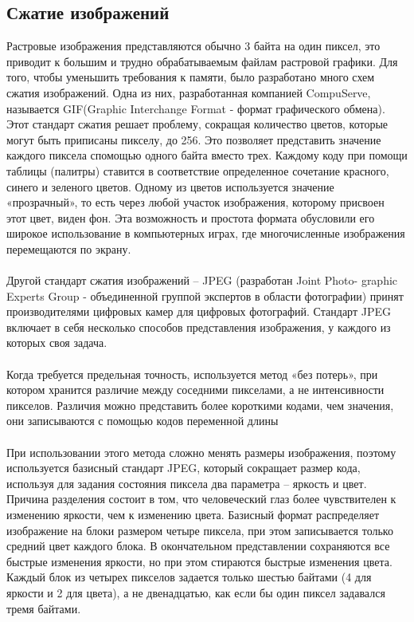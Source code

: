 \subsection{Сжатие изображений}
Растровые изображения представляются обычно 3 байта на один пиксел, это приводит к большим и трудно обрабатываемым файлам растровой графики. Для того, чтобы уменьшить требования к памяти, было разработано много схем сжатия изображений. Одна из них, разработанная компанией CompuServe, называется GIF(Graphic Interchange Format - формат графического обмена). Этот стандарт сжатия решает проблему, сокращая количество цветов, которые могут быть приписаны пикселу, до 256. Это позволяет представить значение каждого пиксела спомощью одного байта вместо трех. Каждому коду при помощи таблицы (палитры) ставится в соответствие определенное сочетание красного, синего и зеленого цветов. Одному из цветов используется значение «прозрачный», то есть через любой участок изображения, которому присвоен этот цвет, виден фон. Эта возможность и простота формата обусловили его широкое использование в компьютерных играх, где многочисленные изображения перемещаются по экрану.\\
\\Другой стандарт сжатия изображений -- JPEG (разработан Joint Photo- graphic Experts Group - объединенной группой экспертов в области фотографии) принят производителями цифровых камер для цифровых фотографий. Стандарт JPEG включает в себя несколько способов представления изображения, у каждого из которых своя задача.\\
\\Когда требуется предельная точность, используется метод «без потерь», при котором хранится различие между соседними пикселами, а не интенсивности пикселов.  Различия можно представить более короткими кодами, чем значения, они записываются с помощью кодов переменной длины\\
\\При использовании этого метода сложно менять размеры изображения, поэтому используется базисный стандарт JPEG, который сокращает размер кода, используя для задания состояния пиксела два параметра – яркость и цвет. Причина разделения состоит в том, что человеческий глаз более чувствителен к изменению яркости, чем к изменению цвета. Базисный формат распределяет изображение на блоки размером четыре пиксела, при этом записывается только средний цвет каждого блока. В окончательном представлении сохраняются все быстрые изменения яркости, но при этом стираются быстрые изменения цвета. Каждый блок из четырех пикселов задается только шестью байтами (4 для яркости и 2 для цвета), а не двенадцатью, как если бы один пиксел задавался тремя байтами.\\

